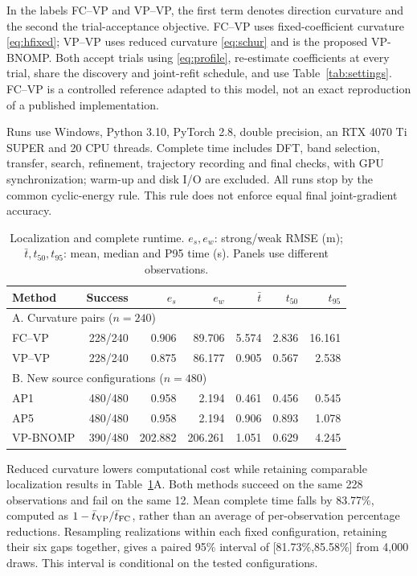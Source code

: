 \documentclass[a4paper,12pt,review]{cas-sc}
\begin{document}
In the labels FC--VP and VP--VP, the first term denotes direction curvature and the second the trial-acceptance objective. FC--VP uses fixed-coefficient curvature \eqref{eq:hfixed}; VP--VP uses reduced curvature \eqref{eq:schur} and is the proposed VP-BNOMP. Both accept trials using \eqref{eq:profile}, re-estimate coefficients at every trial, share the discovery and joint-refit schedule, and use Table~\ref{tab:settings}. FC--VP is a controlled reference adapted to this model, not an exact reproduction of a published implementation.

Runs use Windows, Python 3.10, PyTorch 2.8, double precision, an RTX 4070 Ti SUPER and 20 CPU threads. Complete time includes DFT, band selection, transfer, search, refinement, trajectory recording and final checks, with GPU synchronization; warm-up and disk I/O are excluded. All runs stop by the common cyclic-energy rule. This rule does not enforce equal final joint-gradient accuracy.

\begin{table}[pos=H]
\caption{Localization and complete runtime. $e_s,e_w$: strong/weak RMSE (m); $\bar t,t_{50},t_{95}$: mean, median and P95 time (s). Panels use different observations.}\label{tab:results}
\centering
\begin{tabular}{lrrrrrr}
\toprule
Method & Success & $e_s$ & $e_w$ & $\bar t$ & $t_{50}$ & $t_{95}$ \\
\midrule
\multicolumn{7}{l}{A. Curvature pairs ($n=240$)}\\
FC--VP & 228/240 & 0.906 & 89.706 & 5.574 & 2.836 & 16.161 \\
VP--VP & 228/240 & 0.875 & 86.177 & 0.905 & 0.567 & 2.538 \\
\midrule
\multicolumn{7}{l}{B. New source configurations ($n=480$)}\\
AP1 & 480/480 & 0.958 & 2.194 & 0.461 & 0.456 & 0.545 \\
AP5 & 480/480 & 0.958 & 2.194 & 0.906 & 0.893 & 1.078 \\
VP-BNOMP & 390/480 & 202.882 & 206.261 & 1.051 & 0.629 & 4.245 \\
\bottomrule
\end{tabular}
\end{table}

Reduced curvature lowers computational cost while retaining comparable localization results in Table~\ref{tab:results}A. Both methods succeed on the same 228 observations and fail on the same 12. Mean complete time falls by 83.77\%, computed as $1-\bar t_{\rm VP}/\bar t_{\rm FC}$, rather than an average of per-observation percentage reductions. Resampling realizations within each fixed configuration, retaining their six gaps together, gives a paired 95\% interval of [81.73\%,85.58\%] from 4,000 draws. This interval is conditional on the tested configurations.
\end{document}
